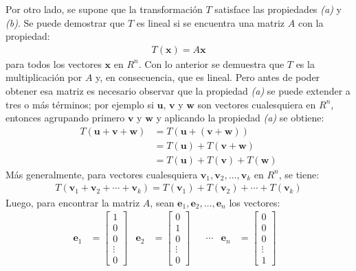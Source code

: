 \documentclass[a4paper,12pt]{article}
\begin{document}
Por otro lado, se supone que la transformación $T$ satisface las propiedades
\emph{(a)} y \emph{(b)}. Se puede demostrar que $T$ es lineal si se encuentra
una matriz $A$ con la propiedad:
\begin{align*}
  T(\mathbf{x})=A\mathbf{x}
\end{align*}
para todos los vectores $\mathbf{x}$ en $R^n$. Con lo anterior se demuestra
que $T$ es la multiplicación por $A$ y, en consecuencia, que es lineal. Pero
antes de poder obtener esa matriz es necesario observar que la propiedad
\emph{(a)} se puede extender a tres o más términos; por ejemplo si
$\mathbf{u}$, $\mathbf{v}$ y $\mathbf{w}$ son vectores cualesquiera en
$R^n$, entonces agrupando primero $\mathbf{v}$ y $\mathbf{w}$ y aplicando la
propiedad \emph{(a)} se obtiene:
\begin{align*}
  T(\mathbf{u}+\mathbf{v}+\mathbf{w})&=T(\mathbf{u}+(\mathbf{v}+\mathbf{w})) \\
  &=T(\mathbf{u})+T(\mathbf{v}+\mathbf{w}) \\
  &=T(\mathbf{u})+T(\mathbf{v})+T(\mathbf{w})
\end{align*}
Más generalmente, para vectores cualesquiera
$\mathbf{v}_1,\mathbf{v}_2,\ldots,\mathbf{v}_k$ en $R^n$, se tiene:
\begin{align*}
  T(\mathbf{v}_1+\mathbf{v}_2+\cdots+\mathbf{v}_k)=T(\mathbf{v}_1)+T(\mathbf{v}_2)+\cdots+T(\mathbf{v}_k)
\end{align*}
Luego, para encontrar la matriz $A$, sean
$\mathbf{e}_1,\mathbf{e}_2,\ldots,\mathbf{e}_n$ los vectores:
\begin{align}
  \mathbf{e}_1&=
  \begin{bmatrix}
    1 \\ 0 \\ 0 \\ \vdots \\ 0
  \end{bmatrix}&
  \mathbf{e}_2&=
  \begin{bmatrix}
    0 \\ 1 \\ 0 \\ \vdots \\ 0
  \end{bmatrix}&
  &\cdots&
  \mathbf{e}_n&=
  \begin{bmatrix}
    0 \\ 0 \\ 0 \\ \vdots \\ 1
  \end{bmatrix}&
  \label{eqn:vect_base}
\end{align}
\end{document}
